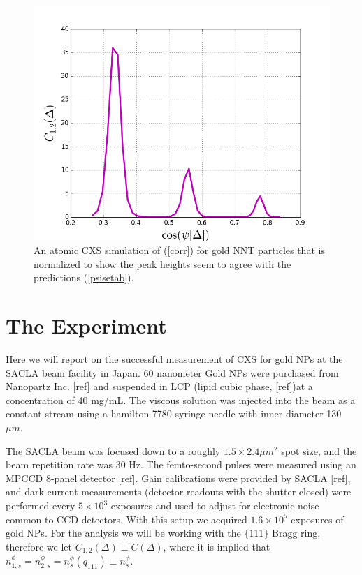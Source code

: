 \documentclass [11pt,fleqn]{article}
\begin{document}
\begin{figure}[h]
\begin{center}
\includegraphics[width=\textwidth,height=\textheight,keepaspectratio]{./cxs_peak.png}
\end{center}
\caption{An atomic CXS simulation of (\ref{corr}) for gold NNT particles that is normalized to show the peak heights seem to agree with the predictions (\ref{psisetab}).}
\label{fig:peak}
\end{figure}



\section{The Experiment}
Here we will report on the successful measurement of CXS for gold NPs at the SACLA beam facility in Japan. 60 nanometer Gold NPs were purchased from Nanopartz Inc. [ref] and suspended in LCP (lipid cubic phase, [ref])at a concentration of 40 mg/mL. The viscous solution was injected into the beam as a constant stream using a  hamilton 7780 syringe needle with inner diameter 130 $\mu m$.

The SACLA beam was focused down to a roughly $1.5 \times 2.4 \mu m ^2$ spot size, and the beam repetition rate was 30 Hz. The femto-second pulses were measured using an MPCCD 8-panel detector [ref]. Gain calibrations were provided by SACLA [ref], and dark current measurements (detector readouts with the shutter closed) were performed every $5\times 10^3$ exposures and used to adjust for electronic noise common to CCD detectors. With this setup we acquired $1.6\times 10^5$ exposures of gold NPs.  For the analysis we will be working with the $\{111\}$ Bragg ring, therefore we let $C_{1,2}(\Delta) \equiv C( \Delta )$, where it is implied that $n_{1,s}^\phi = n_{2,s}^\phi = n_s^\phi(q_{111}) \equiv n_s^\phi$. 
\end{document}
